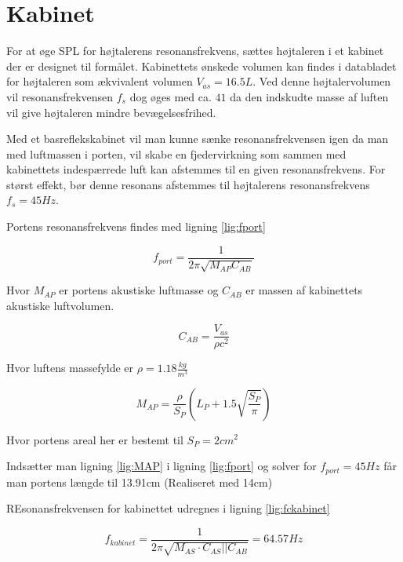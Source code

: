 \section{Kabinet}

For at øge SPL for højtalerens resonansfrekvens, sættes højtaleren i et kabinet der er designet til formålet.
Kabinettets ønskede volumen kan findes i databladet for højtaleren som ækvivalent volumen $V_{as} = 16.5L$. Ved denne højtalervolumen vil resonansfrekvensen $f_s$ dog øges med ca. $41$ da den indskudte masse af luften vil give højtaleren mindre bevægelsesfrihed.

Med et basreflekskabinet vil man kunne sænke resonansfrekvensen igen da man med luftmassen i porten, vil skabe en fjedervirkning som sammen med kabinettets indespærrede luft kan afstemmes til en given resonansfrekvens. For størst effekt, bør denne resonans afstemmes til højtalerens resonansfrekvens $f_s = 45Hz$.

Portens resonansfrekvens findes med ligning \ref{lig:fport}

\begin{equation}\label{lig:fport}
f_{port}=\frac{1}{2 \pi \sqrt{M_{AP} C_{AB}}}
\end{equation}

Hvor $M_{AP}$ er portens akustiske luftmasse og $C_{AB}$ er massen af kabinettets akustiske luftvolumen.

\begin{equation}\label{lig:CAB}
C_{AB}=\frac{V_{as}}{\rho c^2}
	\end{equation}
	
	Hvor luftens massefylde er $\rho=1.18 \frac{kg}{m^3}$ 
	
\begin{equation}\label{lig:MAP}
M_{AP}=\frac{\rho}{S_P} (L_P+1.5\sqrt{\frac{S_P}{\pi}})
\end{equation}	

Hvor portens areal her er bestemt til $S_P=2cm^2$

Indsætter man ligning \ref{lig:MAP} i ligning \ref{lig:fport} og solver for $f_{port}=45Hz$ får man portens længde til 13.91cm (Realiseret med 14cm)

REsonansfrekvensen for kabinettet udregnes i ligning \ref{lig:fckabinet}

\begin{equation}\label{lig:fckabinet}
f_{kabinet}=\frac{1}{2 \pi \sqrt{M_{AS} \cdot C_{AS}||C_{AB}}} = 64.57Hz
\end{equation}